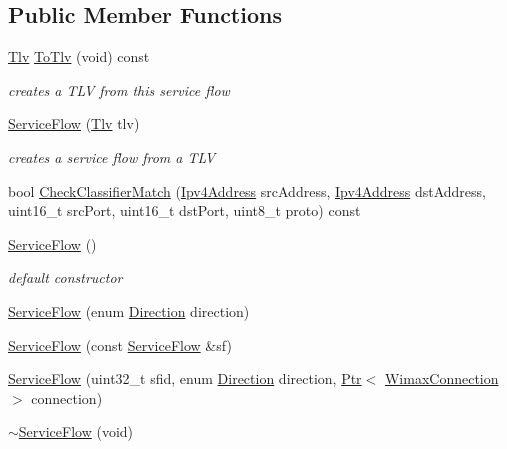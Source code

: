 \subsection*{Public Member Functions}
\begin{DoxyCompactItemize}
\item 
\hyperlink{classns3_1_1Tlv}{Tlv} \hyperlink{classns3_1_1ServiceFlow_a093dd393288e740cd63d1a8c8d871dd0}{To\+Tlv} (void) const 
\begin{DoxyCompactList}\small\item\em creates a T\+LV from this service flow \end{DoxyCompactList}\item 
\hyperlink{classns3_1_1ServiceFlow_aeed524f52389f03831476b5759240778}{Service\+Flow} (\hyperlink{classns3_1_1Tlv}{Tlv} tlv)
\begin{DoxyCompactList}\small\item\em creates a service flow from a T\+LV \end{DoxyCompactList}\item 
bool \hyperlink{classns3_1_1ServiceFlow_a48a6a5d9b1e906db9ef252a850d51f71}{Check\+Classifier\+Match} (\hyperlink{classns3_1_1Ipv4Address}{Ipv4\+Address} src\+Address, \hyperlink{classns3_1_1Ipv4Address}{Ipv4\+Address} dst\+Address, uint16\+\_\+t src\+Port, uint16\+\_\+t dst\+Port, uint8\+\_\+t proto) const 
\item 
\hyperlink{classns3_1_1ServiceFlow_a7a0814984cf39798544703ecc1cbc7f5}{Service\+Flow} ()
\begin{DoxyCompactList}\small\item\em default constructor \end{DoxyCompactList}\item 
\hyperlink{classns3_1_1ServiceFlow_a98650e32aa92ed3bd9309ffff814911e}{Service\+Flow} (enum \hyperlink{classns3_1_1ServiceFlow_ae14b8dc8bb371bad10fe078110655d4f}{Direction} direction)
\item 
\hyperlink{classns3_1_1ServiceFlow_a45e24aa23d78831b288f8ca1062a2f2d}{Service\+Flow} (const \hyperlink{classns3_1_1ServiceFlow}{Service\+Flow} \&sf)
\item 
\hyperlink{classns3_1_1ServiceFlow_a289e116be69f627aaaaf018166e09093}{Service\+Flow} (uint32\+\_\+t sfid, enum \hyperlink{classns3_1_1ServiceFlow_ae14b8dc8bb371bad10fe078110655d4f}{Direction} direction, \hyperlink{classns3_1_1Ptr}{Ptr}$<$ \hyperlink{classns3_1_1WimaxConnection}{Wimax\+Connection} $>$ connection)
\item 
\hyperlink{classns3_1_1ServiceFlow_a289a0331bd56a717d9f871f74c1f15cf}{$\sim$\+Service\+Flow} (void)

\end{DoxyCompactItemize}
